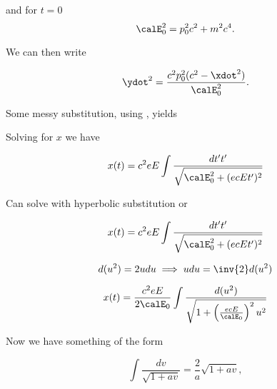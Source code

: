 {and for \(t=0\)
\begin{equation}\label{eqn:relativisticElectrodynamicsT3:100b}
\calE_0^2 = p_0^2 c^2 + m^2 c^4.
\end{equation}

We can then write

\begin{equation}\label{eqn:relativisticElectrodynamicsT3:120}
\ydot^2 = \frac{ c^2 p_0^2 (c^2 - \xdot^2)}{ \calE_0^2 }.
\end{equation}

Some messy substitution, using , yields



Solving for \(x\) we have

\begin{equation}\label{eqn:relativisticElectrodynamicsT3:220}
x(t) = c^2 e E \int \frac{dt' t'}{\sqrt{ \calE_0^2 + (e c E t')^2 }}
\end{equation}

Can solve with hyperbolic substitution or

\begin{equation}\label{eqn:relativisticElectrodynamicsT3:240}
x(t) = c^2 e E \int \frac{dt' t'}{\sqrt{ \calE_0^2 + (e c E t')^2 }}
\end{equation}

\begin{equation}\label{eqn:relativisticElectrodynamicsT3:260}
d(u^2) = 2 u du \implies u du = \inv{2} d(u^2)
\end{equation}

\begin{equation}\label{eqn:relativisticElectrodynamicsT3:280}
x(t) = \frac{c^2 e E}{2 \calE_0} \int \frac{d (u^2)}{\sqrt{ 1 + \left(\frac{e c E}{\calE_0}\right)^2 u^2 }}
\end{equation}

Now we have something of the form

\begin{equation}\label{eqn:relativisticElectrodynamicsT3:290}
\int \frac{d v}{\sqrt{1 + a v}} = \frac{2}{a} \sqrt{1 + a v},
\end{equation}

}
